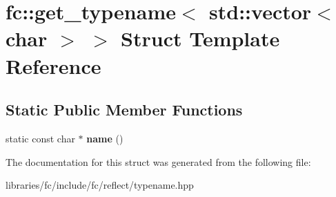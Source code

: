 \hypertarget{structfc_1_1get__typename_3_01std_1_1vector_3_01char_01_4_01_4}{}\section{fc\+:\+:get\+\_\+typename$<$ std\+:\+:vector$<$ char $>$ $>$ Struct Template Reference}
\label{structfc_1_1get__typename_3_01std_1_1vector_3_01char_01_4_01_4}
\subsection*{Static Public Member Functions}
\begin{DoxyCompactItemize}
\item 
\mbox{\label{structfc_1_1get__typename_3_01std_1_1vector_3_01char_01_4_01_4_a36979b06bca4cc9d20fd8d8beb103532}} 
static const char $\ast$ {\bfseries name} ()
\end{DoxyCompactItemize}


The documentation for this struct was generated from the following file\+:\begin{DoxyCompactItemize}
\item 
libraries/fc/include/fc/reflect/typename.\+hpp\end{DoxyCompactItemize}
